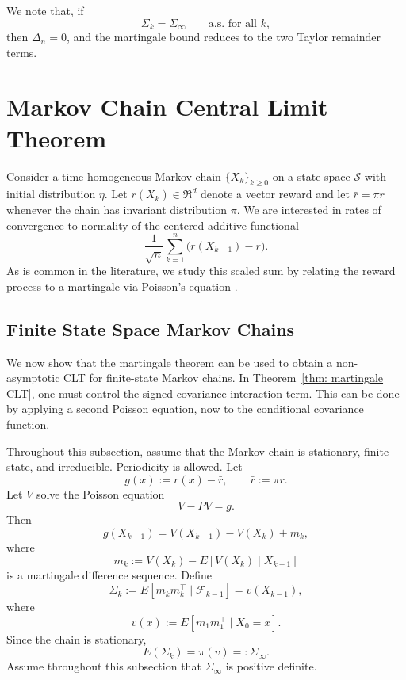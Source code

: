 \documentclass[11pt]{article}
\begin{document}
We note that, if
\[
\Sigma_k=\Sigma_\infty
\qquad\text{a.s. for all }k,
\]
then $\Delta_n=0$, and the martingale bound reduces to the two Taylor
remainder terms.



\section{Markov Chain Central Limit Theorem}\label{sec: Markov}
Consider a time-homogeneous Markov chain $\{X_k\}_{k\geq 0}$ on a state space $\mathcal{S}$ with initial distribution $\eta$. Let $r(X_k)\in\Re^d$ denote a vector reward and let $\bar r=\pi r$ whenever the chain has invariant distribution $\pi$. We are interested in rates of convergence to normality of the centered additive functional
\[
    \frac{1}{\sqrt n}\sum_{k=1}^n\bigl(r(X_{k-1})-\bar r\bigr).
\]
As is common in the literature, we study this scaled sum by relating the reward process to a martingale via Poisson's equation \citep{douc2018markov,makowski2002poisson,glynn1996liapounov,glynn2023solution}.

\subsection{Finite State Space Markov Chains}
\label{subsec: finite_state_MC_corrected}

We now show that the martingale theorem can be used to obtain a
non-asymptotic CLT for finite-state Markov chains.  In Theorem~\ref{thm: martingale CLT}, one must control
the signed covariance-interaction term.  This can
be done by applying a second Poisson equation, now to the conditional
covariance function.

Throughout this subsection, assume that the Markov chain is stationary,
finite-state, and irreducible.  Periodicity is allowed.  Let
\[
    g(x):=r(x)-\bar r,
    \qquad
    \bar r:=\pi r.
\]
Let \(V\) solve the Poisson equation
\[
    V-PV=g.
\]
Then
\[
    g(X_{k-1})
    =
    V(X_{k-1})-V(X_k)+m_k,
\]
where
\[
    m_k:=V(X_k)-E[V(X_k)\mid X_{k-1}]
\]
is a martingale difference sequence.  Define
\[
    \Sigma_k:=E[m_km_k^\top\mid \mathcal F_{k-1}]
    =
    v(X_{k-1}),
\]
where
\[
    v(x):=E[m_1m_1^\top\mid X_0=x].
\]
Since the chain is stationary,
\[
    E(\Sigma_k)=\pi(v)=:\Sigma_\infty.
\]
Assume throughout this subsection that \(\Sigma_\infty\) is positive definite.
\end{document}
